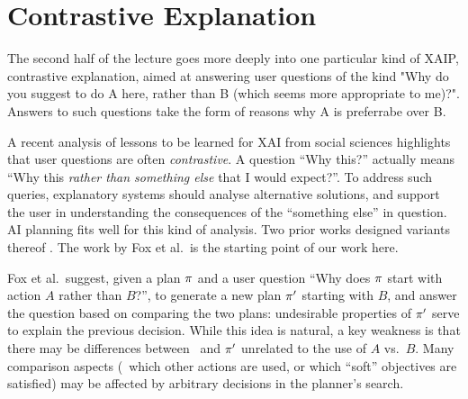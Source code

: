 \section{Contrastive Explanation}


The second half of the lecture goes more deeply into one particular
kind of XAIP, contrastive explanation, aimed at answering user
questions of the kind "Why do you suggest to do A here, rather than B
(which seems more appropriate to me)?". Answers to such questions take
the form of reasons why A is preferrabe over B.


A recent analysis \cite{miller:ai-19} of lessons to be learned for XAI
from social sciences highlights that user questions are often
\emph{contrastive}. A question ``Why this?'' actually means ``Why this
\emph{rather than something else} that I would expect?''. To address
such queries, explanatory systems should analyse alternative
solutions, and support the user in understanding the consequences of
the ``something else'' in question.
%
AI planning fits well for this kind of analysis. Two prior works
designed variants thereof
\cite{fox:etal:ijcai-ws-17,miller:corr-18}. The work by Fox et al.\ is
the starting point of our work here.

Fox et al.\ suggest, given a plan $\pi$ and a user question ``Why
does $\pi$ start with action $A$ rather than $B$?'', to generate a
new plan $\pi'$ starting with $B$, and answer the question based on
comparing the two plans: undesirable properties of $\pi'$ serve to
explain the previous decision. While this idea is natural, a key
weakness is
%
%
%
that there may be differences between \plan\ and $\pi'$ unrelated to
the use of $A$ vs.\ $B$. Many comparison aspects (\eg\ which other
actions are used, or which ``soft'' objectives are satisfied) may be
affected by arbitrary decisions in the planner's search.


